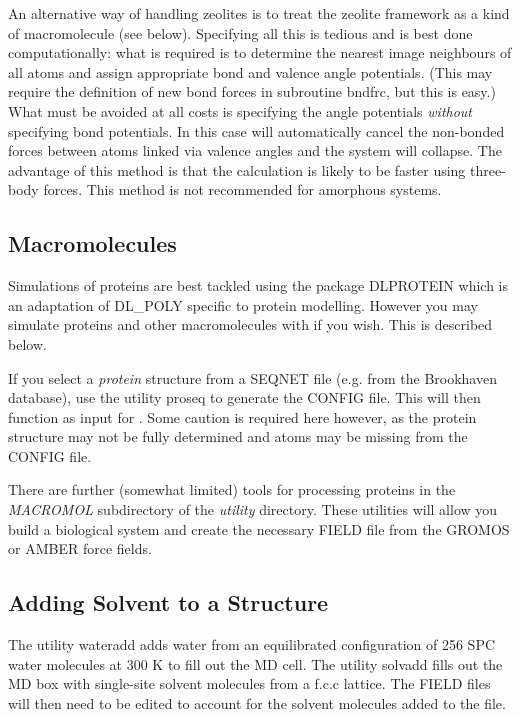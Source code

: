 An alternative way of handling zeolites is to treat the zeolite
framework as a kind of macromolecule (see below). 
Specifying all this is tedious and is best done
computationally: what is required is to determine the nearest image
neighbours of all atoms and assign appropriate bond and valence angle
potentials. (This may require the definition of new bond forces in
subroutine {\sc bndfrc}, but this is easy.) What must be avoided at
all costs is specifying the angle potentials {\em without} specifying
bond potentials. In this case \D{} will
automatically cancel the non-bonded forces
between atoms linked via valence angles
and the system will collapse. The advantage of this method is that the
calculation is likely to be faster using
three-body forces. This method is not
recommended for amorphous systems.

\subsection{Macromolecules}

Simulations of proteins are best tackled using the package DLPROTEIN
\cite{dlprotein} which is an adaptation of DL\_POLY
specific to protein modelling. However you may simulate proteins and
other macromolecules with \D{} if you wish. This is described below.

If you select a {\em protein} structure from a SEQNET file (e.g.  from
the Brookhaven database), use the utility {\sc proseq} to generate the
CONFIG file. This will then function as input for \D{}. Some caution is
required here however, as the protein structure may not be fully
determined and atoms may be missing from the CONFIG file.

There are further (somewhat limited) tools for processing proteins in
the {\em MACROMOL} subdirectory of the \D{} {\em utility} directory.
These utilities will allow you build a biological system and
create the necessary FIELD file from the
GROMOS \cite{gunsteren-87a} or
AMBER \cite{weiner-86a} force
fields.

\subsection{Adding Solvent to a Structure}

The utility {\sc wateradd} adds water from an equilibrated
configuration of 256 SPC water molecules at 300 K to fill out the MD
cell. The utility {\sc solvadd} fills out the MD box with single-site
solvent molecules from a f.c.c lattice. The FIELD files will then need
to be edited to account for the solvent molecules added to the file.

